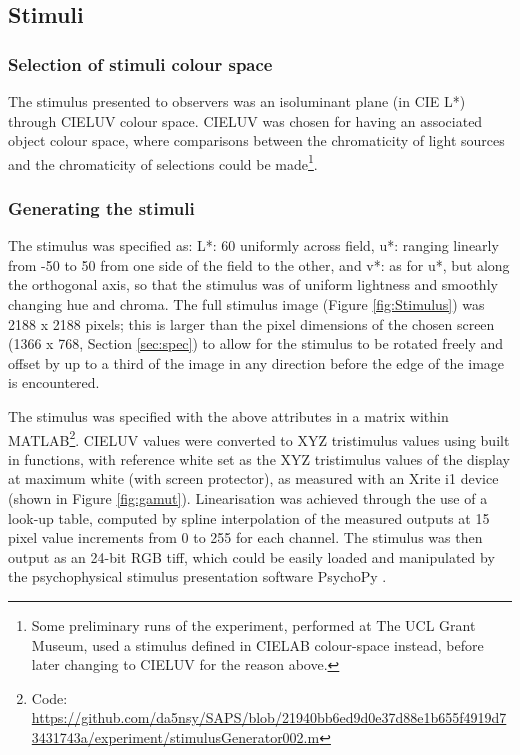 

\subsection{Stimuli} \label{sec:stimuli}

\subsubsection{Selection of stimuli colour space}

The stimulus presented to observers was an isoluminant plane (in CIE L*) through CIELUV colour space. CIELUV was chosen for having an associated object colour space, where comparisons between the chromaticity of light sources and the chromaticity of selections could be made\footnote{Some preliminary runs of the experiment, performed at The UCL Grant Museum, used a stimulus defined in CIELAB colour-space instead, before later changing to CIELUV for the reason above.}. 

\subsubsection{Generating the stimuli}

The stimulus was specified as: L*: 60 uniformly across field, u*: ranging linearly from -50 to 50 from one side of the field to the other, and v*: as for u*, but along the orthogonal axis, so that the stimulus was of uniform lightness and smoothly changing hue and chroma. The full stimulus image (Figure \ref{fig:Stimulus}) was 2188 x 2188 pixels; this is larger than the pixel dimensions of the chosen screen (1366 x 768, Section \ref{sec:spec}) to allow for the stimulus to be rotated freely and offset by up to a third of the image in any direction before the edge of the image is encountered. 

The stimulus was specified with the above attributes in a matrix within \gls{MATLAB}\footnote{Code: \url{https://github.com/da5nsy/SAPS/blob/21940bb6ed9d0e37d88e1b655f4919d73431743a/experiment/stimulusGenerator002.m}}. CIELUV values were converted to XYZ tristimulus values using built in functions, with reference white set as the XYZ tristimulus values of the display at maximum white (with screen protector), as measured with an Xrite i1 device (shown in Figure \ref{fig:gamut}). Linearisation was achieved through the use of a look-up table, computed by spline interpolation of the measured outputs at 15 pixel %
value increments from 0 to 255 for each channel. The stimulus was then output as an 24-bit RGB tiff, which could be easily loaded and manipulated by the psychophysical stimulus presentation software PsychoPy \citep{peirce_psychopypsychophysics_2007}. %

